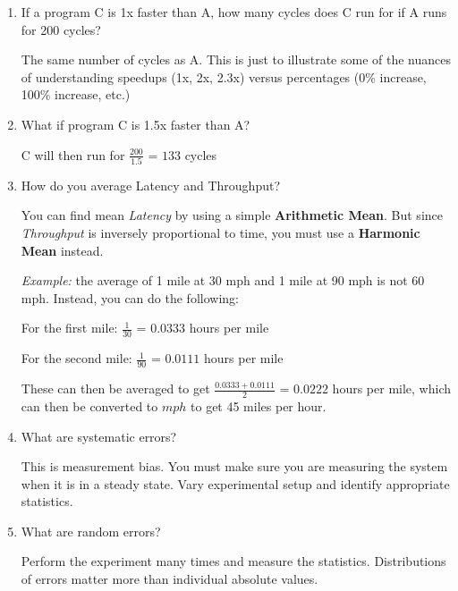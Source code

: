 \documentclass[12pt]{article}
\newenvironment{QandA}{\begin{enumerate}[label=\bfseries\arabic*.]\bfseries}
                      {\end{enumerate}}
\newenvironment{answered}{\par\quad\normalfont}{}
\begin{document}
\begin{QandA}
    \item If a program C is 1x faster than A, how many cycles does C run for if A runs for 200 cycles?
        \begin{answered}
        The same number of cycles as A. This is just to illustrate some of the nuances of understanding speedups (1x, 2x, 2.3x) versus percentages (0\% increase, 100\% increase, etc.)  
        \end{answered}
    
    \item What if program C is 1.5x faster than A?
        \begin{answered}
        C will then run for $\frac{200}{1.5}$ = $133$ cycles
        \end{answered}
        
    \item How do you average Latency and Throughput?
        \begin{answered}
        You can find mean \textit{Latency} by using a simple \textbf{Arithmetic Mean}. But since \textit{Throughput} is inversely proportional to time, you must use a \textbf{Harmonic Mean} instead. 
        
        \textit{Example:} the average of 1 mile at 30 mph and 1 mile at 90 mph is not 60 mph. Instead, you can do the following:
        
        For the first mile: $\frac{1}{30}$ = $0.0333$ hours per mile
        
        For the second mile: $\frac{1}{90}$ = $0.0111$ hours per mile
        
        These can then be averaged to get $\frac{0.0333+0.0111}{2}$ = $0.0222$ hours per mile, which can then be converted to $mph$ to get 45 miles per hour.
        \end{answered}
        
    \item What are systematic errors?
        \begin{answered}
        This is measurement bias. You must make sure you are measuring the system when it is in a steady state. Vary experimental setup and identify appropriate statistics.
        \end{answered}
        
    \item What are random errors?
        \begin{answered}
        Perform the experiment many times and measure the statistics. Distributions of errors matter more than individual absolute values.
        \end{answered}
        

\end{QandA}
\end{document}
